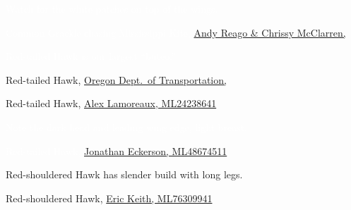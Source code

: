 \documentclass[t]{beamer}
\begin{document}
{
\begin{frame}{\textcolor{white}{Watch for the white patches on top of the wings.}}


\tinyfill \textcolor{white}{Common Grackle chasing Mississippi Kite, \href{https://flickr.com/photos/wildreturn/28138609132}{Andy Reago \& Chrissy McClarren, }}
\end{frame}
}

{
\begin{frame}{\textcolor{white}{Red-tailed Hawk is our largest “buteo.”}}


\tinyfill Red-tailed Hawk, \href{https://flickr.com/photos/oregondot/5396663758}{Oregon Dept.~of Transportation, }
\end{frame}
}

{
\begin{frame}


\tinyfill Red-tailed Hawk, \href{https://macaulaylibrary.org/asset/24238641}{Alex Lamoreaux, ML24238641}
\end{frame}
}


{
\begin{frame}{\textcolor{white}{Note the dark head and leading wing edge, light breast.}}


\tinyfill \textcolor{white}{Red-tailed Hawk, \href{https://macaulaylibrary.org/asset/48674511}{Jonathan Eckerson, ML48674511}}
\end{frame}
}

%
%

{
\begin{frame}{Red-shouldered Hawk has slender build with long legs.}


\tinyfill Red-shouldered Hawk, \href{https://macaulaylibrary.org/asset/76309941}{Eric Keith, ML76309941}
\end{frame}
}
\end{document}
